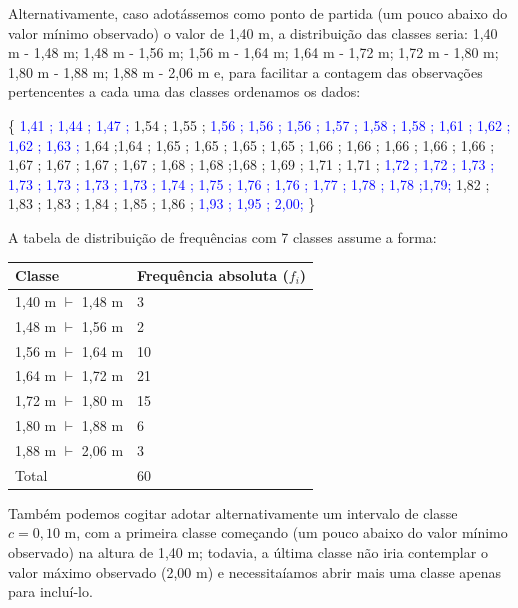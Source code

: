 \documentclass[
]{book}
\begin{document}
\hfill\break

Alternativamente, caso adotássemos como ponto de partida (um pouco abaixo do valor mínimo observado) o valor de 1,40 m, a distribuição das classes seria: 1,40 m - 1,48 m; 1,48 m - 1,56 m; 1,56 m - 1,64 m; 1,64 m - 1,72 m; 1,72 m - 1,80 m; 1,80 m - 1,88 m; 1,88 m - 2,06 m e, para facilitar a contagem das observações pertencentes a cada uma das classes ordenamos os dados:

\hfill\break

\{
\textcolor{blue}{1,41 ; 1,44 ; 1,47 ;}
1,54 ; 1,55 ;
\textcolor{blue}{1,56 ; 1,56 ; 1,56 ; 1,57 ; 1,58 ; 1,58 ; 1,61 ; 1,62 ; 1,62 ; 1,63 ;}
1,64 ;1,64 ; 1,65 ; 1,65 ; 1,65 ; 1,65 ; 1,66 ; 1,66 ; 1,66 ; 1,66 ; 1,66 ; 1,67 ; 1,67 ; 1,67 ; 1,67 ; 1,68 ; 1,68 ;1,68 ; 1,69 ; 1,71 ; 1,71 ;
\textcolor{blue}{1,72 ; 1,72 ; 1,73 ; 1,73 ; 1,73 ; 1,73 ; 1,73 ; 1,74 ; 1,75 ; 1,76 ; 1,76 ; 1,77 ;  1,78 ; 1,78 ;1,79;} 1,82 ; 1,83 ; 1,83 ; 1,84 ; 1,85 ; 1,86 ;
\textcolor{blue}{1,93 ; 1,95 ; 2,00;} \}

\hfill\break

A tabela de distribuição de frequências com 7 classes assume a forma:

\hfill\break

\begin{longtable}[]{@{}ll@{}}
\toprule()
Classe & Frequência absoluta (\(f_{i}\)) \\
\midrule()
\endhead
1,40 m \(\vdash\) 1,48 m & 3 \\
1,48 m \(\vdash\) 1,56 m & 2 \\
1,56 m \(\vdash\) 1,64 m & 10 \\
1,64 m \(\vdash\) 1,72 m & 21 \\
1,72 m \(\vdash\) 1,80 m & 15 \\
1,80 m \(\vdash\) 1,88 m & 6 \\
1,88 m \(\vdash\) 2,06 m & 3 \\
Total & 60 \\
\bottomrule()
\end{longtable}

\hfill\break

Também podemos cogitar adotar alternativamente um intervalo de classe \(c=0,10\) m, com a primeira classe começando (um pouco abaixo do valor mínimo observado) na altura de 1,40 m; todavia, a última classe não iria contemplar o valor máximo observado (2,00 m) e necessitaíamos abrir mais uma classe apenas para incluí-lo.

\hfill\break
\end{document}
